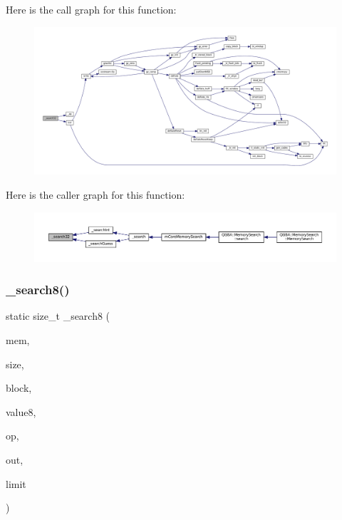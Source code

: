 Here is the call graph for this function\+:
\nopagebreak
\begin{figure}[H]
\begin{center}
\leavevmode
\includegraphics[width=350pt]{mem-search_8c_aef1a36a86840034ac9b64b277a9c78b8_cgraph}
\end{center}
\end{figure}
Here is the caller graph for this function\+:
\nopagebreak
\begin{figure}[H]
\begin{center}
\leavevmode
\includegraphics[width=350pt]{mem-search_8c_aef1a36a86840034ac9b64b277a9c78b8_icgraph}
\end{center}
\end{figure}
\mbox{\label{mem-search_8c_a109715625d99b7db170075ecdc68363e}} 
\subsubsection{\texorpdfstring{\+\_\+search8()}{\_search8()}}
{\footnotesize\ttfamily static size\+\_\+t \+\_\+search8 (\begin{DoxyParamCaption}\item[{const void $\ast$}]{mem,  }\item[{size\+\_\+t}]{size,  }\item[{const struct m\+Core\+Memory\+Block $\ast$}]{block,  }\item[{uint8\+\_\+t}]{value8,  }\item[{enum m\+Core\+Memory\+Search\+Op}]{op,  }\item[{struct m\+Core\+Memory\+Search\+Results $\ast$}]{out,  }\item[{size\+\_\+t}]{limit }\end{DoxyParamCaption})\hspace{0.3cm}{\ttfamily [static]}}

